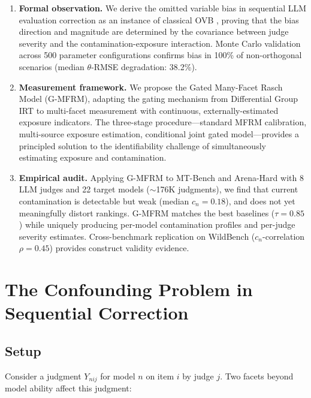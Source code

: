 \documentclass[11pt]{article}
\newcommand{\gmfrm}{G-MFRM}
\newcommand{\cn}{c_n}
\begin{document}
\begin{enumerate}[leftmargin=*,itemsep=2pt]
\item \textbf{Formal observation.} We derive the omitted variable bias in sequential LLM evaluation correction as an instance of classical OVB \citep{angrist2009mostly}, proving that the bias direction and magnitude are determined by the covariance between judge severity and the contamination-exposure interaction. Monte Carlo validation across 500 parameter configurations confirms bias in 100\% of non-orthogonal scenarios (median $\theta$-RMSE degradation: 38.2\%).

\item \textbf{Measurement framework.} We propose the Gated Many-Facet Rasch Model (\gmfrm{}), adapting the gating mechanism from Differential Group IRT \citep{soares2023dgirt} to multi-facet measurement with continuous, externally-estimated exposure indicators. The three-stage procedure---standard MFRM calibration, multi-source exposure estimation, conditional joint gated model---provides a principled solution to the identifiability challenge of simultaneously estimating exposure and contamination.

\item \textbf{Empirical audit.} Applying \gmfrm{} to MT-Bench and Arena-Hard with 8 LLM judges and 22 target models (${\sim}$176K judgments), we find that current contamination is detectable but weak (median $\cn = 0.18$), and does not yet meaningfully distort rankings. \gmfrm{} matches the best baselines ($\tau = 0.85$) while uniquely producing per-model contamination profiles and per-judge severity estimates. Cross-benchmark replication on WildBench ($\cn$-correlation $\rho = 0.45$) provides construct validity evidence.
\end{enumerate}

\section{The Confounding Problem in Sequential Correction}
\label{sec:ovb}

\subsection{Setup}

Consider a judgment $Y_{nij}$ for model $n$ on item $i$ by judge $j$. Two facets beyond model ability affect this judgment:
\end{document}
